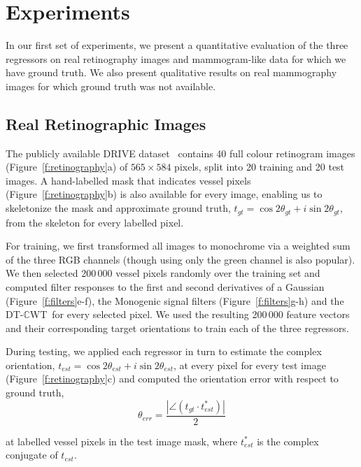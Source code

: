 \documentclass[10pt,twocolumn,letterpaper]{article}
\newcommand{\fref}[1]{Figure~\ref{#1}}
\def\dtcwt{DT-$\mathbb{C}$WT}
\newcommand{\comment}[1]{}
\begin{document}
\section{Experiments}
\label{s:expts}
In our first set of experiments, we present a quantitative evaluation of the three regressors on real retinography images and mammogram-like data for which we have ground truth. We also present qualitative results on real mammography images for which ground truth was not available.
\comment{Are differences statistically significant?}


\subsection{Real Retinographic Images}
\label{s:expts_retinography}
The publicly available DRIVE dataset~\cite{Staal_etal_TMI04} contains 40 full colour retinogram images (\fref{f:retinography}a) of $565{\times}584$ pixels, split into 20 training and 20 test images. A hand-labelled mask that indicates vessel pixels (\fref{f:retinography}b) is also available for every image, enabling us to skeletonize the mask and approximate ground truth, $t_{gt} = \cos 2\theta_{gt} + i\sin 2\theta_{gt}$, from the skeleton for every labelled pixel.\comment{It is questionable how well this constitutes ground truth}

For training, we first transformed all images to monochrome via a weighted sum of the three RGB channels (though using only the green channel is also popular). We then selected 200\,000 vessel pixels randomly over the training set and computed filter responses to the first and second derivatives of a Gaussian (\fref{f:filters}e-f), the Monogenic signal filters (\fref{f:filters}g-h) and the \dtcwt~for every selected pixel. We used the resulting 200\,000 feature vectors and their corresponding target orientations to train each of the three regressors.
\comment{Why 200k points? Was this limit dictated by system requirements?}

During testing, we applied each regressor in turn to estimate the complex orientation, $t_{est} = \cos 2\theta_{est} + i\sin 2\theta_{est}$, at every pixel for every test image (\fref{f:retinography}c) and computed the orientation error with respect to ground truth,
%
\begin{equation}
	\theta_{err} = \frac{|\angle(t_{gt} \cdot t_{est}^*)|}{2}
\end{equation}

\noindent at labelled vessel pixels in the test image mask, where $t_{est}^*$ is the complex conjugate of $t_{est}$.
\end{document}
